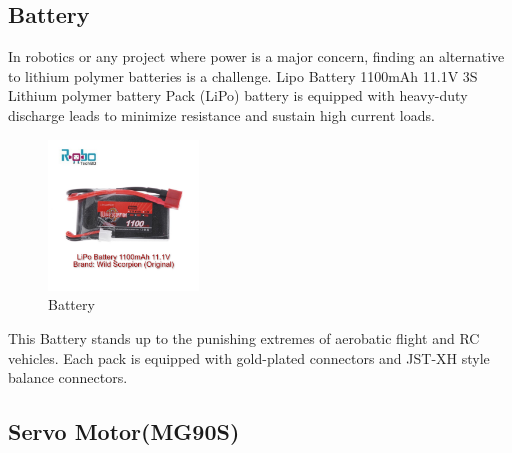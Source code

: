 \documentclass[conference]{IEEEtran}
\begin{document}
\subsection{Battery}

In robotics or any project where power is a major concern, finding an alternative to lithium polymer batteries is a challenge. Lipo Battery 1100mAh 11.1V 3S Lithium polymer battery Pack (LiPo) battery is equipped with heavy-duty discharge leads to minimize resistance and sustain high current loads.
\begin{figure}[th]
    \centering
    \includegraphics[height=4cm,width=\linewidth]{images/11.1V-Lipo-Battery-11mAh-1.jpg}
    \caption{Battery}
    \label{fig:enter-label}
\end{figure}
This Battery stands up to the punishing extremes of aerobatic flight and RC vehicles. Each pack is equipped with gold-plated connectors and JST-XH style balance connectors.


\subsection{Servo Motor(MG90S)}
\end{document}
